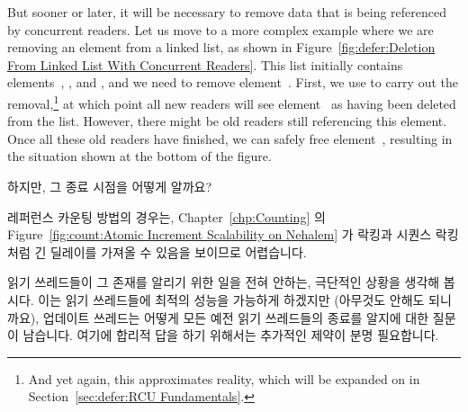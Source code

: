 But sooner or later, it will be necessary to remove data that is
being referenced by concurrent readers.
Let us move to a more complex example where we are removing an element
from a linked list, as shown in
Figure~\ref{fig:defer:Deletion From Linked List With Concurrent Readers}.
This list initially contains elements~, , and ,
and we need to remove element~.
First, we use  to carry out the removal,\footnote{
	And yet again, this approximates reality, which will be expanded
	on in Section~\ref{sec:defer:RCU Fundamentals}.}
at which point all new readers will see element~ as having been
deleted from the list.
However, there might be old readers still referencing this element.
Once all these old readers have finished, we can safely free
element~, resulting in the situation shown at the bottom of
the figure.
\fi

하지만, 그 종료 시점을 어떻게 알까요?

레퍼런스 카운팅 방법의 경우는,
Chapter~\ref{chp:Counting} 의
Figure~\ref{fig:count:Atomic Increment Scalability on Nehalem}
가 락킹과 시퀀스 락킹처럼 긴 딜레이를 가져올 수 있음을 보이므로 어렵습니다.

읽기 쓰레드들이 그 존재를 알리기 위한 일을 전혀 안하는, 극단적인 상황을 생각해
봅시다.
이는 읽기 쓰레드들에 최적의 성능을 가능하게 하겠지만 (아무것도 안해도
되니까요), 업데이트 쓰레드는 어떻게 모든 예전 읽기 쓰레드들의 종료를 알지에
대한 질문이 남습니다.
여기에 합리적 답을 하기 위해서는 추가적인 제약이 분명 필요합니다.

